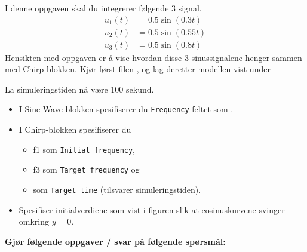 


  \item[p)]
    I denne oppgaven skal du integrerer
    følgende 3 signal.
\begin{align}
  \label{eq:213}
  u_{1}(t) & = 0.5 \sin(0.3 t) \\
  \label{eq:211}
  u_{2}(t) & = 0.5 \sin(0.55 t)\\
  \label{eq:211s}
  u_{3}(t) & = 0.5 \sin(0.8 t)
\end{align}
Hensikten med oppgaven er å vise hvordan disse 3 sinussignalene henger  
sammen med {\sf Chirp}-blokken. 
Kjør først filen , og lag deretter
   modellen vist under
      \begin{figure}[H]
    \centering
    \hspace*{0mm}
  \end{figure}
  {\color{red}La simuleringstiden nå være 100 sekund.  }
  
  \begin{itemize}
  \item   I  {\sf  Sine Wave}-blokken
 spesifiserer du {\tt Frequency}-feltet som {\sf [w1, w2, w3]}. 
\item   I  {\sf  Chirp}-blokken
  spesifiserer du
  \begin{itemize}
  \item 
  {\sf f1} som {\tt Initial frequency},
  \item 
  {\sf f3} som {\tt Target frequency} og
  \item 
  {} som {\tt  Target time} (tilsvarer simuleringstiden).
  \end{itemize}
  \item Spesifiser initialverdiene som
    vist i figuren slik at cosinuskurvene svinger omkring $y{=}0$.
  \end{itemize}

    {\bf Gjør følgende oppgaver / svar på følgende spørsmål:    }
    
